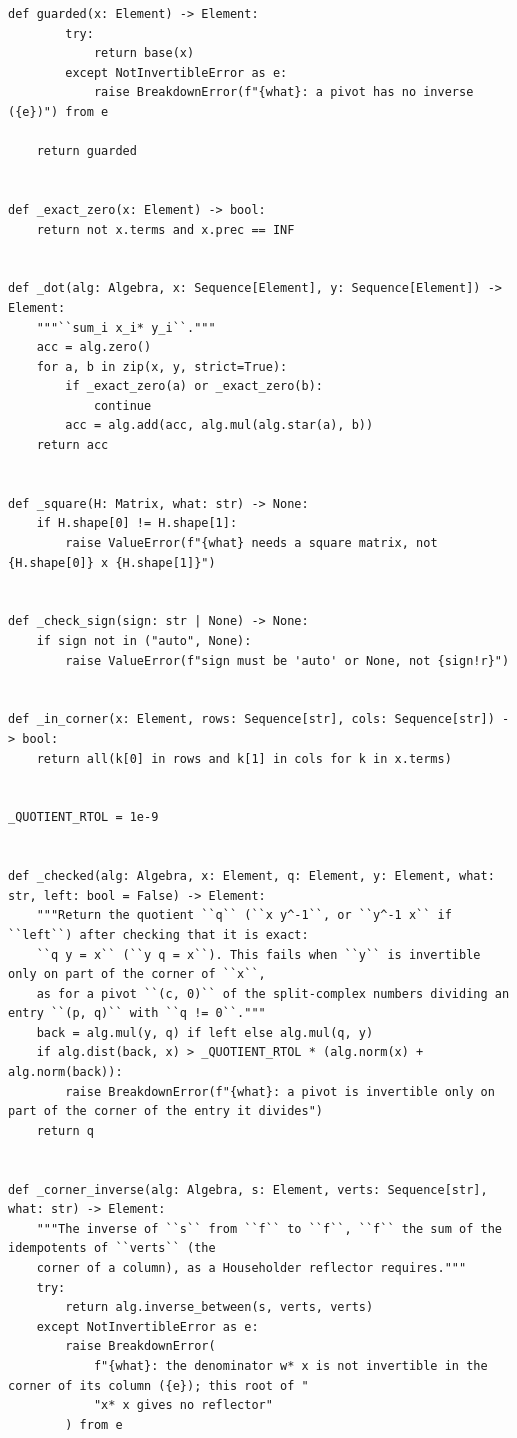 \documentclass[12pt, a4paper]{report}
\theoremstyle{plain}
\theoremstyle{definition}
\theoremstyle{remark}
\theoremstyle{plain}
\begin{document}
\begin{lstlisting}[style=dsqcode]
    def guarded(x: Element) -> Element:
        try:
            return base(x)
        except NotInvertibleError as e:
            raise BreakdownError(f"{what}: a pivot has no inverse ({e})") from e

    return guarded


def _exact_zero(x: Element) -> bool:
    return not x.terms and x.prec == INF


def _dot(alg: Algebra, x: Sequence[Element], y: Sequence[Element]) -> Element:
    """``sum_i x_i* y_i``."""
    acc = alg.zero()
    for a, b in zip(x, y, strict=True):
        if _exact_zero(a) or _exact_zero(b):
            continue
        acc = alg.add(acc, alg.mul(alg.star(a), b))
    return acc


def _square(H: Matrix, what: str) -> None:
    if H.shape[0] != H.shape[1]:
        raise ValueError(f"{what} needs a square matrix, not {H.shape[0]} x {H.shape[1]}")


def _check_sign(sign: str | None) -> None:
    if sign not in ("auto", None):
        raise ValueError(f"sign must be 'auto' or None, not {sign!r}")


def _in_corner(x: Element, rows: Sequence[str], cols: Sequence[str]) -> bool:
    return all(k[0] in rows and k[1] in cols for k in x.terms)


_QUOTIENT_RTOL = 1e-9


def _checked(alg: Algebra, x: Element, q: Element, y: Element, what: str, left: bool = False) -> Element:
    """Return the quotient ``q`` (``x y^-1``, or ``y^-1 x`` if ``left``) after checking that it is exact:
    ``q y = x`` (``y q = x``). This fails when ``y`` is invertible only on part of the corner of ``x``,
    as for a pivot ``(c, 0)`` of the split-complex numbers dividing an entry ``(p, q)`` with ``q != 0``."""
    back = alg.mul(y, q) if left else alg.mul(q, y)
    if alg.dist(back, x) > _QUOTIENT_RTOL * (alg.norm(x) + alg.norm(back)):
        raise BreakdownError(f"{what}: a pivot is invertible only on part of the corner of the entry it divides")
    return q


def _corner_inverse(alg: Algebra, s: Element, verts: Sequence[str], what: str) -> Element:
    """The inverse of ``s`` from ``f`` to ``f``, ``f`` the sum of the idempotents of ``verts`` (the
    corner of a column), as a Householder reflector requires."""
    try:
        return alg.inverse_between(s, verts, verts)
    except NotInvertibleError as e:
        raise BreakdownError(
            f"{what}: the denominator w* x is not invertible in the corner of its column ({e}); this root of "
            "x* x gives no reflector"
        ) from e



\end{lstlisting}
\end{document}
